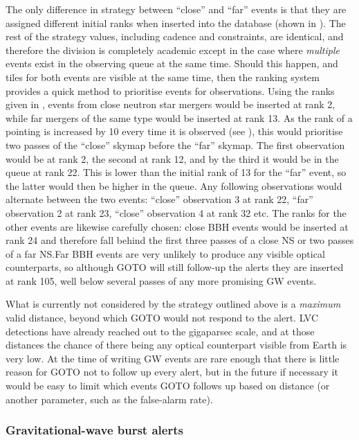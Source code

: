 \begin{colsection}
The only difference in strategy between ``close'' and ``far'' events is that they are assigned different initial ranks when inserted into the database (shown in ). The rest of the strategy values, including cadence and constraints, are identical, and therefore the division is completely academic except in the case where \emph{multiple} events exist in the observing queue at the same time. Should this happen, and tiles for both events are visible at the same time, then the ranking system provides a quick method to prioritise events for observations. Using the ranks given in , events from close neutron star mergers would be inserted at rank 2, while far mergers of the same type would be inserted at rank 13. As the rank of a pointing is increased by 10 every time it is observed (see ), this would prioritise two passes of the ``close'' skymap before the ``far'' skymap. The first observation would be at rank 2, the second at rank 12, and by the third it would be in the queue at rank 22. This is lower than the initial rank of 13 for the ``far'' event, so the latter would then be higher in the queue. Any following observations would alternate between the two events: ``close'' observation 3 at rank 22, ``far'' observation 2 at rank 23, ``close'' observation 4 at rank 32 etc. The ranks for the other events are likewise carefully chosen: close BBH events would be inserted at rank 24 and therefore fall behind the first three passes of a close NS or two passes of a far NS.\@ Far BBH events are very unlikely to produce any visible optical counterparts, so although GOTO will still follow-up the alerts they are inserted at rank 105, well below several passes of any more promising GW events.

What is currently not considered by the strategy outlined above is a \textit{maximum} valid distance, beyond which GOTO would not respond to the alert. LVC detections have already reached out to the gigaparsec scale, and at those distances the chance of there being any optical counterpart visible from Earth is very low. At the time of writing GW events are rare enough that there is little reason for GOTO not to follow up every alert, but in the future if necessary it would be easy to limit which events GOTO follows up based on distance (or another parameter, such as the false-alarm rate).

\newpage

\subsubsection{Gravitational-wave burst alerts}


\end{colsection}
